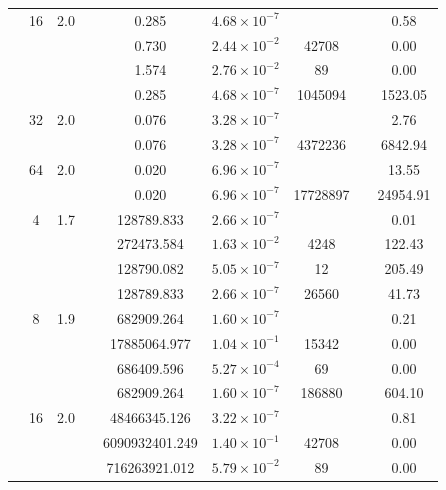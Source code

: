 \begin{table}[htbp]
\begin{tabular}{l S[table-format=3.0] S[table-format=4.1] l S[table-format=3.3] S[table-format=1.2e2] S[table-format=6.0] S[table-format=2.0] S[table-format=4.2]}
     & 16 & 2.0 &  & 0.285 & $4.68 \times 10^{-7}$ & {\text{---}} & {\text{---}} & 0.58 \\
     &  &  &  & 0.730 & $2.44 \times 10^{-2}$ & 42708 & {\text{---}} & 0.00 \\
     &  &  &  & 1.574 & $2.76 \times 10^{-2}$ & 89 & {\text{---}} & 0.00 \\
     &  &  &  & 0.285 & $4.68 \times 10^{-7}$ & 1045094 & {\text{---}} & 1523.05 \\
     & 32 & 2.0 &  & 0.076 & $3.28 \times 10^{-7}$ & {\text{---}} & {\text{---}} & 2.76 \\
     &  &  &  & 0.076 & $3.28 \times 10^{-7}$ & 4372236 & {\text{---}} & 6842.94 \\
     & 64 & 2.0 &  & 0.020 & $6.96 \times 10^{-7}$ & {\text{---}} & {\text{---}} & 13.55 \\
     &  &  &  & 0.020 & $6.96 \times 10^{-7}$ & 17728897 & {\text{---}} & 24954.91 \\
    \midrule
     & 4 & 1.7 &  & 128789.833 & $2.66 \times 10^{-7}$ & {\text{---}} & {\text{---}} & 0.01 \\
     &  &  &  & 272473.584 & $1.63 \times 10^{-2}$ & 4248 & {\text{---}} & 122.43 \\
     &  &  &  & 128790.082 & $5.05 \times 10^{-7}$ & 12 & {\text{---}} & 205.49 \\
     &  &  &  & 128789.833 & $2.66 \times 10^{-7}$ & 26560 & {\text{---}} & 41.73 \\
     & 8 & 1.9 &  & 682909.264 & $1.60 \times 10^{-7}$ & {\text{---}} & {\text{---}} & 0.21 \\
     &  &  &  & 17885064.977 & $1.04 \times 10^{-1}$ & 15342 & {\text{---}} & 0.00 \\
     &  &  &  & 686409.596 & $5.27 \times 10^{-4}$ & 69 & {\text{---}} & 0.00 \\
     &  &  &  & 682909.264 & $1.60 \times 10^{-7}$ & 186880 & {\text{---}} & 604.10 \\
     & 16 & 2.0 &  & 48466345.126 & $3.22 \times 10^{-7}$ & {\text{---}} & {\text{---}} & 0.81 \\
     &  &  &  & 6090932401.249 & $1.40 \times 10^{-1}$ & 42708 & {\text{---}} & 0.00 \\
     &  &  &  & 716263921.012 & $5.79 \times 10^{-2}$ & 89 & {\text{---}} & 0.00 \\

\end{tabular}
\end{table}
